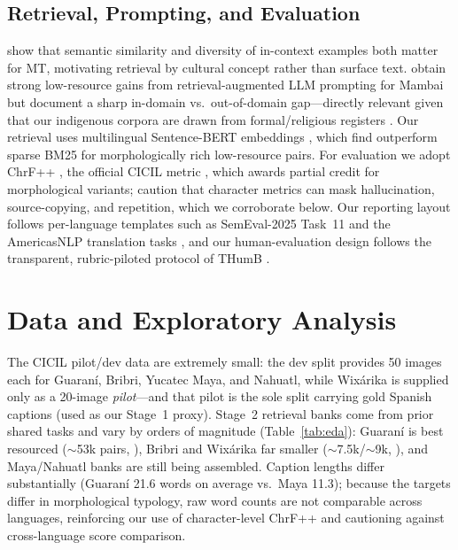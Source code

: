 \documentclass[11pt]{article}
\begin{document}
\subsection{Retrieval, Prompting, and Evaluation}
\citet{agrawal2023icl} show that semantic similarity and diversity of in-context
examples both matter for MT, motivating retrieval by cultural concept rather than
surface text. \citet{merx2024mambai} obtain strong low-resource gains from
retrieval-augmented LLM prompting for Mambai but document a sharp in-domain vs.\
out-of-domain gap—directly relevant given that our indigenous corpora are drawn
from formal/religious registers \citep{mager2021americasnlp}. Our retrieval uses
multilingual Sentence-BERT embeddings \citep{reimers2020multilingual}, which
\citet{nie2022parc} find outperform sparse BM25 for morphologically rich
low-resource pairs. For evaluation we adopt ChrF++ \citep{popovic2017chrfpp}, the
official CICIL metric \citep{bui2026cicil}, which awards partial credit for
morphological variants; \citet{kumar2026chrf} caution that character metrics can
mask hallucination, source-copying, and repetition, which we corroborate below.
Our reporting layout follows per-language templates such as SemEval-2025 Task~11
\citep{muhammad2025semeval} and the AmericasNLP translation tasks
\citep{ebrahimi2023americasnlp,ebrahimi2024americasnlp}, and our human-evaluation
design follows the transparent, rubric-piloted protocol of THumB
\citep{kasai2022thumb}.

\section{Data and Exploratory Analysis}
The CICIL pilot/dev data are extremely small: the dev split provides 50 images
each for Guaraní, Bribri, Yucatec Maya, and Nahuatl, while Wixárika is supplied
only as a 20-image \emph{pilot}—and that pilot is the sole split carrying gold
Spanish captions (used as our Stage~1 proxy). Stage~2 retrieval banks come from
prior shared tasks and vary by orders of magnitude
(Table~\ref{tab:eda}): Guaraní is best resourced ($\sim$53k pairs,
\citealp{ebrahimi2023americasnlp}), Bribri and Wixárika far smaller
($\sim$7.5k/$\sim$9k, \citealp{mager2021americasnlp}), and Maya/Nahuatl banks are
still being assembled. Caption lengths differ substantially (Guaraní 21.6 words
on average vs.\ Maya 11.3); because the targets differ in morphological
typology, raw word counts are not comparable across languages, reinforcing our
use of character-level ChrF++ and cautioning against cross-language score
comparison.
\end{document}
